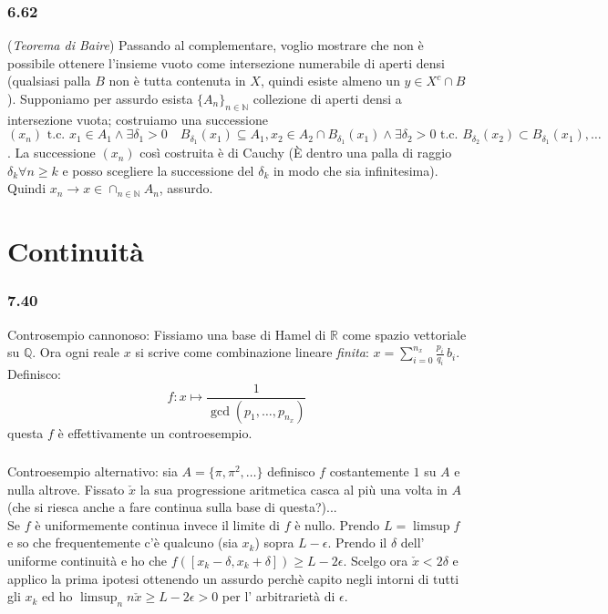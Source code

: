 \documentclass[a4paper,11pt]{article}
\newcommand{\ex}[1]{\subsubsection*{#1}}
\newcommand{\QQ}{\mathbb{Q}}
\newcommand{\NN}{\mathbb{N}}
\newcommand{\RR}{\mathbb{R}}
\newcommand{\tc}{\mbox{ t.c. }}
\begin{document}
\ex{6.62} ({\it Teorema di Baire}) Passando al complementare, voglio mostrare che non è possibile ottenere l'insieme vuoto come intersezione numerabile di aperti densi (qualsiasi palla $B$ non è tutta contenuta in $X$, quindi esiste almeno un $y \in X^c \cap B$). Supponiamo per assurdo esista $\{A_n\}_{n\in\NN}$ collezione di aperti densi a intersezione vuota; costruiamo una successione $(x_n) \tc x_1 \in A_1 \wedge \exists \delta_1 > 0 \quad B_{\delta_1}(x_1) \subseteq A_1, x_2 \in A_2 \cap B_{\delta_1}(x_1) \wedge \exists \delta_2 > 0 \tc B_{\delta_2}(x_2) \subset B_{\delta_1}(x_1), \ldots $. La successione $(x_n)$ così costruita è di Cauchy (\`E dentro una palla di raggio $\delta_k \forall n \ge k$ e posso scegliere la successione del $\delta_k$ in modo che sia infinitesima). Quindi $x_n \rightarrow x \in \cap_{n\in\NN} A_n$, assurdo.
\section{Continuità}
\ex{7.40}Controsempio cannonoso: Fissiamo una base di Hamel di $\RR$ come spazio vettoriale su $\QQ$. Ora ogni reale $x$ si scrive come combinazione lineare {\it finita}: $x=\sum_{i=0}^{n_x} \frac{p_i}{q_i}\, b_i$. Definisco:
$$
f:x\mapsto \frac{1}{\gcd(p_1,\ldots,p_{n_x})}
$$ 
questa $f$ è effettivamente un controesempio.\\
\ex{}
Controesempio alternativo: sia $A=\{\pi,\pi^2,\ldots\}$ definisco $f$ costantemente $1$ su $A$ e nulla altrove. Fissato $\check{x}$ la sua progressione aritmetica casca al più una volta in $A$ (che si riesca anche a fare continua sulla base di questa?)...\\
Se $f$ è uniformemente continua invece il limite di $f$ è nullo. Prendo $L=\limsup f$ e so che frequentemente c'è qualcuno (sia $x_k$) sopra $L-\epsilon$. Prendo il $\delta$ dell' uniforme continuità e ho che $f([x_k-\delta,x_k+\delta])\ge L-2\epsilon$. Scelgo ora $\check{x}<2\delta$ e applico la prima ipotesi ottenendo un assurdo perchè capito negli intorni di tutti gli $x_k$ ed ho $\limsup_n n\check{x}\ge L-2\epsilon>0$ per l' arbitrarietà di $\epsilon$.
 
\end{document}
